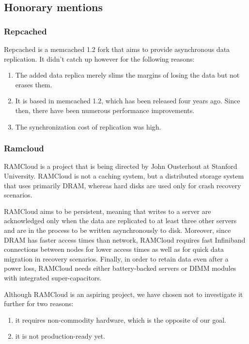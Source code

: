 \subsection{Honorary mentions}

\subsubsection{Repcached}

Repcached is a memcached 1.2 fork that aims to provide asynchronous data 
replication. It didn't catch up however for the following reasons:

\begin{enumerate}
	\item The added data replica merely slims the margins of losing the data 
		but not erases them.
	\item It is based in memcached 1.2, which has been released four years ago.  
		Since then, there have been numerous performance improvements.
	\item The synchronization cost of replication was high.
\end{enumerate}

\subsubsection{Ramcloud}

RAMCloud\cite{ramcloud} is a project that is being directed by John Ousterhout 
at Stanford University. RAMCloud is not a caching system, but a distributed 
storage system that uses primarily DRAM, whereas hard disks are used only for 
crash recovery scenarios\cite{recovery-ramcloud}.

RAMCloud aims to be persistent, meaning that writes to a server are 
acknowledged only when the data are replicated to at least three other servers 
and are in the process to be written asynchronously to disk. Moreover, since 
DRAM has faster access times than network, RAMCloud requires fast Infiniband 
connections between nodes for lower access times as well as for quick data 
migration in recovery scenarios. Finally, in order to retain data even after a 
power loss, RAMCloud needs either battery-backed servers or DIMM modules with 
integrated super-capacitors.

Although RAMCloud is an aspiring project, we have chosen not to investigate it 
further for two reasons:

\begin{enumerate}
	\item it requires non-commodity hardware, which is the opposite of our 
		goal.
	\item it is not production-ready yet.
\end{enumerate}

